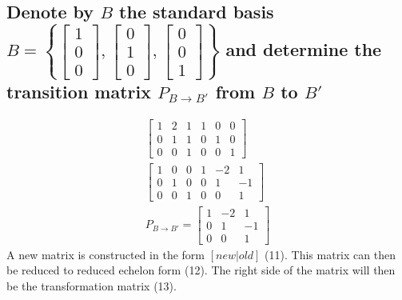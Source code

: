 \documentclass[12pt, a4paper]{article}
\begin{document}
		\subsection{Denote by $B$ the standard basis $B=\left\{\begin{bmatrix}1\\0\\0\end{bmatrix},\begin{bmatrix}0\\1\\0\end{bmatrix},\begin{bmatrix}0\\0\\1\end{bmatrix}\right\}$ and determine the transition matrix $P_{B\rightarrow B'}$ from $B$ to $B'$}
			\begin{align}
				\left[\begin{array}{ccc|ccc}1&2&1&1&0&0\\0&1&1&0&1&0\\0&0&1&0&0&1\end{array}\right]\\
				\left[\begin{array}{ccc|ccc}1&0&0&1&-2&1\\0&1&0&0&1&-1\\0&0&1&0&0&1\end{array}\right]\\
				P_{B\rightarrow B'}=\begin{bmatrix}1&-2&1\\0&1&-1\\0&0&1\end{bmatrix}
			\end{align}
			A new matrix is constructed in the form $[new | old]$ (11). This matrix can then be reduced to reduced echelon form (12). The right side of the matrix will then be the transformation matrix (13).
\end{document}
